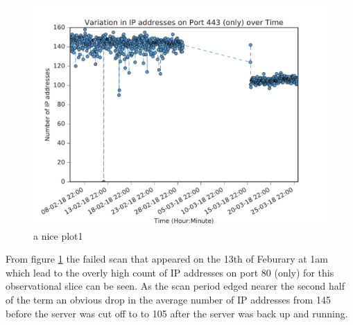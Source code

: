\documentclass[a4wide,leqno,12pt]{report}
\begin{document}
\begin{figure}[H]
\centering
\includegraphics[scale=.5]{pdf_images/VariationInIpAddressesOnPort443OverTime}
\caption{a nice plot1}
\label{fig:port443ZMap}
\end{figure}



From figure \ref{fig:port443ZMap} the failed scan that appeared on the 13th of Feburary at 1am which lead to the overly high count of IP addresses on port 80 (only) for this observational slice can be seen. As the scan period edged nearer the second half of the term an obvious drop in the average number of IP addresses from 145 before the server was cut off to to 105 after the server was back up and running.
\end{document}
